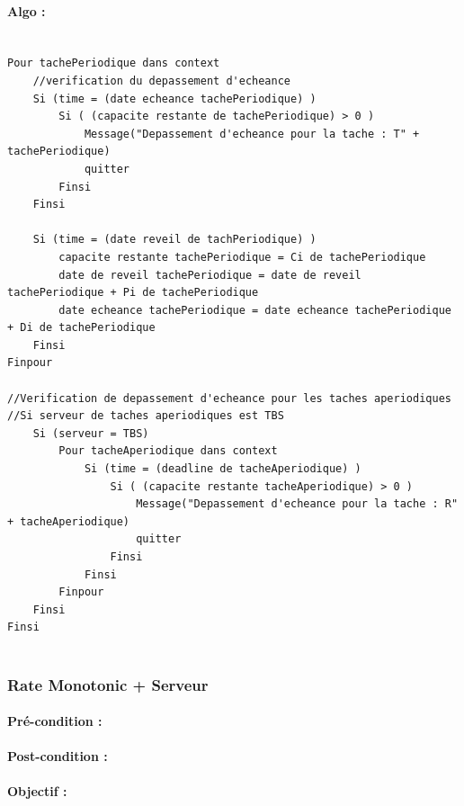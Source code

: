 				\paragraph{Algo :} 
					\begin{lstlisting}
					
Pour tachePeriodique dans context
	//verification du depassement d'echeance
	Si (time = (date echeance tachePeriodique) )
		Si ( (capacite restante de tachePeriodique) > 0 )
			Message("Depassement d'echeance pour la tache : T" + tachePeriodique)
			quitter
		Finsi
	Finsi
	
	Si (time = (date reveil de tachPeriodique) )
		capacite restante tachePeriodique = Ci de tachePeriodique
		date de reveil tachePeriodique = date de reveil tachePeriodique + Pi de tachePeriodique
		date echeance tachePeriodique = date echeance tachePeriodique + Di de tachePeriodique
	Finsi
Finpour

//Verification de depassement d'echeance pour les taches aperiodiques
//Si serveur de taches aperiodiques est TBS
	Si (serveur = TBS)
		Pour tacheAperiodique dans context
			Si (time = (deadline de tacheAperiodique) )
				Si ( (capacite restante tacheAperiodique) > 0 )
					Message("Depassement d'echeance pour la tache : R" + tacheAperiodique)
					quitter
				Finsi
			Finsi
		Finpour
	Finsi
Finsi
		
					\end{lstlisting}
			\subsubsection{Rate Monotonic + Serveur}
				\paragraph{Pré-condition :} 
				\paragraph{Post-condition :} 
				\paragraph{Objectif :} 
